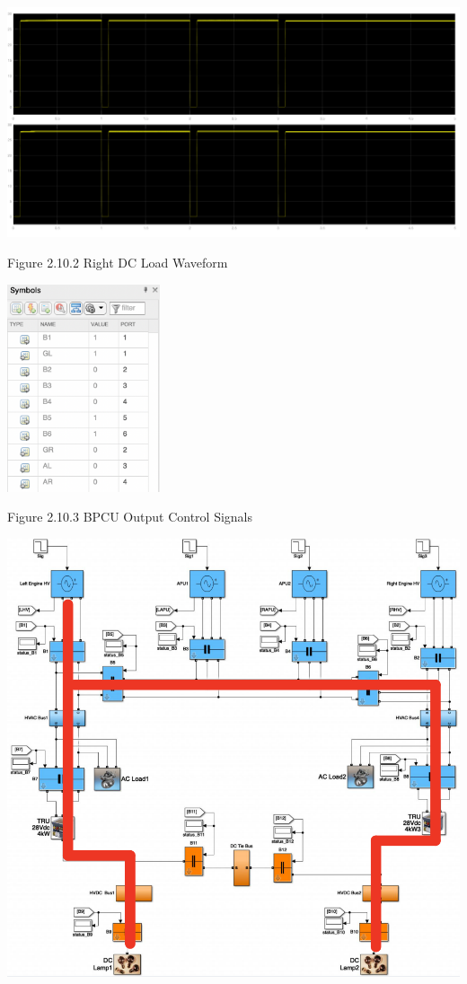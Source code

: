 \documentclass{mcmthesis}
\begin{document}
\includegraphics[trim= 0 0.255\imageheight{} 0 0, clip, width = 0.185\imageheight{}]{gr_ar_al_load2.png}
\begin{center}
\small{Figure 2.10.2 Right DC Load Waveform}
\end{center}
\begin{center}
\includegraphics[width=4.5cm]{gr_ar_al_signals.png}
\end{center}
\begin{center}
\small{Figure 2.10.3 BPCU Output Control Signals}
\end{center}
\begin{center}
\includegraphics[width=14.5cm]{gr_ar_al.png}
\end{center}
\end{document}
